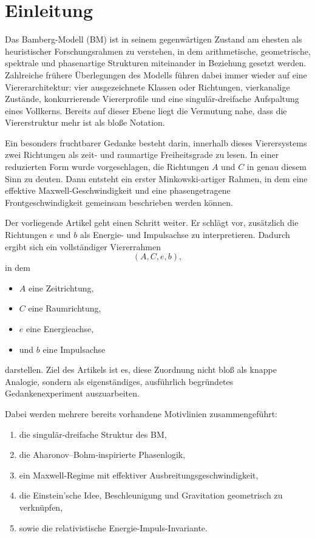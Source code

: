 \documentclass[11pt,a4paper]{article}
\theoremstyle{definition}
\theoremstyle{plain}
\begin{document}
	\section{Einleitung}
	
	Das Bamberg-Modell (BM) ist in seinem gegenwärtigen Zustand am ehesten als heuristischer Forschungsrahmen zu verstehen, in dem arithmetische, geometrische, spektrale und phasenartige Strukturen miteinander in Beziehung gesetzt werden. Zahlreiche frühere Überlegungen des Modells führen dabei immer wieder auf eine Viererarchitektur: vier ausgezeichnete Klassen oder Richtungen, vierkanalige Zustände, konkurrierende Viererprofile und eine singulär-dreifache Aufspaltung eines Vollkerns. Bereits auf dieser Ebene liegt die Vermutung nahe, dass die Viererstruktur mehr ist als bloße Notation.
	
	Ein besonders fruchtbarer Gedanke besteht darin, innerhalb dieses Vierersystems zwei Richtungen als zeit- und raumartige Freiheitsgrade zu lesen. In einer reduzierten Form wurde vorgeschlagen, die Richtungen $A$ und $C$ in genau diesem Sinn zu deuten. Dann entsteht ein erster Minkowski-artiger Rahmen, in dem eine effektive Maxwell-Geschwindigkeit und eine phasengetragene Frontgeschwindigkeit gemeinsam beschrieben werden können.
	
	Der vorliegende Artikel geht einen Schritt weiter. Er schlägt vor, zusätzlich die Richtungen $e$ und $b$ als Energie- und Impulsachse zu interpretieren. Dadurch ergibt sich ein vollständiger Viererrahmen
	\[
	(A,C,e,b),
	\]
	in dem
	\begin{itemize}[leftmargin=2em]
		\item $A$ eine Zeitrichtung,
		\item $C$ eine Raumrichtung,
		\item $e$ eine Energieachse,
		\item und $b$ eine Impulsachse
	\end{itemize}
	darstellen. Ziel des Artikels ist es, diese Zuordnung nicht bloß als knappe Analogie, sondern als eigenständiges, ausführlich begründetes Gedankenexperiment auszuarbeiten.
	
	Dabei werden mehrere bereits vorhandene Motivlinien zusammengeführt:
	\begin{enumerate}[leftmargin=2em]
		\item die singulär-dreifache Struktur des BM,
		\item die Aharonov--Bohm-inspirierte Phasenlogik,
		\item ein Maxwell-Regime mit effektiver Ausbreitungsgeschwindigkeit,
		\item die Einstein’sche Idee, Beschleunigung und Gravitation geometrisch zu verknüpfen,
		\item sowie die relativistische Energie-Impuls-Invariante.
	\end{enumerate}
	
\end{document}
